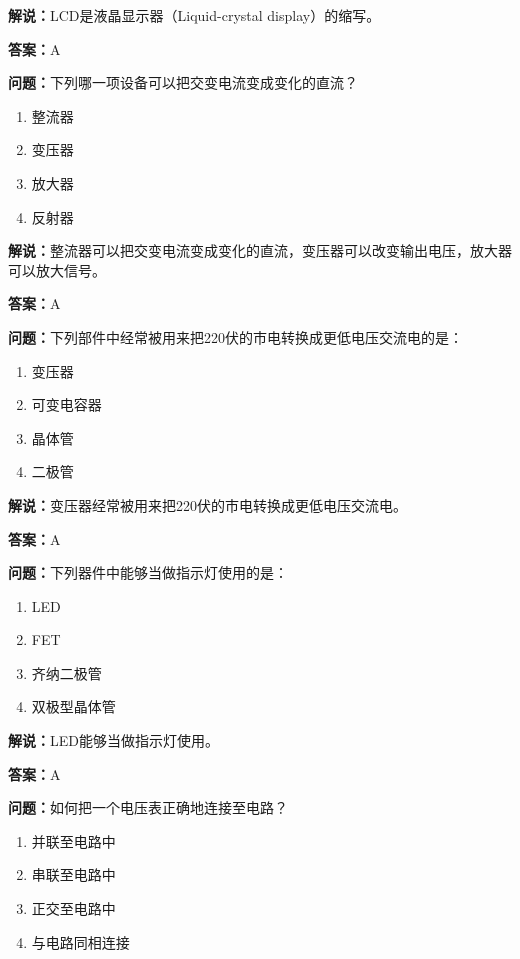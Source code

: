 \documentclass[UTF8]{ctexbook}
\begin{document}
\textbf{解说：}LCD是液晶显示器（Liquid-crystal display）的缩写。%

\textbf{答案：}A

\textbf{问题：}下列哪一项设备可以把交变电流变成变化的直流？

\begin{enumerate}[label=\Alph*), leftmargin=3em]
  \item 整流器
  \item 变压器
  \item 放大器
  \item 反射器
\end{enumerate}

\textbf{解说：}整流器可以把交变电流变成变化的直流，变压器可以改变输出电压，放大器可以放大信号。%

\textbf{答案：}A

\textbf{问题：}下列部件中经常被用来把220伏的市电转换成更低电压交流电的是：

\begin{enumerate}[label=\Alph*), leftmargin=3em]
  \item 变压器
  \item 可变电容器
  \item 晶体管
  \item 二极管
\end{enumerate}

\textbf{解说：}变压器经常被用来把220伏的市电转换成更低电压交流电。%

\textbf{答案：}A

\textbf{问题：}下列器件中能够当做指示灯使用的是：

\begin{enumerate}[label=\Alph*), leftmargin=3em]
  \item LED
  \item FET
  \item 齐纳二极管
  \item 双极型晶体管
\end{enumerate}

\textbf{解说：}LED能够当做指示灯使用。%

\textbf{答案：}A

\textbf{问题：}如何把一个电压表正确地连接至电路？

\begin{enumerate}[label=\Alph*), leftmargin=3em]
  \item 并联至电路中
  \item 串联至电路中
  \item 正交至电路中
  \item 与电路同相连接
\end{enumerate}
\end{document}
